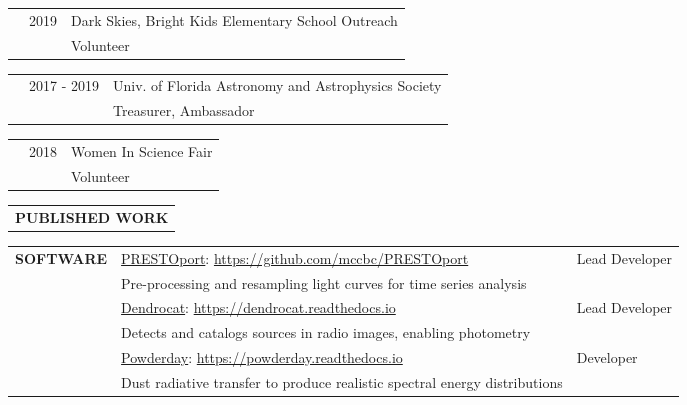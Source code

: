 \documentclass{article}
\begin{document}
\vspace{0.25cm}
\begin{tabular}{p{4cm}p{2.2cm}l}
    &2019 & Dark Skies, Bright Kids Elementary School Outreach \\
    &             & \small Volunteer
\end{tabular}

\vspace{0.25cm}
\begin{tabular}{p{4cm}p{2.2cm}l}
    &2017 - 2019 & Univ. of Florida Astronomy and Astrophysics Society \\
    &             & \small Treasurer, Ambassador
\end{tabular}

\vspace{0.25cm}
\begin{tabular}{p{4cm}p{2.2cm}l}
    &2018 & Women In Science Fair \\
    &             & \small Volunteer
\end{tabular}
\vspace{0.5cm}

\renewcommand\refname{\vskip -1cm}
\nocite{*}


\newpage
\begin{tabular}{p{4cm}}
   \large{\textbf{PUBLISHED WORK}} \vspace{-0.45cm}\\
\end{tabular}

\hspace{4.6cm}\begin{minipage}{\dimexpr\textwidth-5.2cm}

\xdef\tpd{\the\prevdepth}
\end{minipage}
\vspace{0.5cm}


\thispagestyle{empty}


\begin{tabular}{p{4cm}ll}
    \large{\textbf{SOFTWARE}} &\href{https://github.com/mccbc/PRESTOport}{PRESTOport}: \href{https://github.com/mccbc/PRESTOport}{https://github.com/mccbc/PRESTOport} &  Lead Developer\\
    &\small Pre-processing and resampling light curves for time series analysis & \vspace{0.25cm} \\
    &\href{https://github.com/cmcclellan1010/dendrocat
}{Dendrocat}: \href{https://dendrocat.readthedocs.io}{https://dendrocat.readthedocs.io} & Lead Developer \\
    &\small Detects and catalogs sources in radio images, enabling photometry & \vspace{0.25cm} \\
    &\href{https://powderday.readthedocs.io/en/latest/index.html}{Powderday}: \href{https://powderday.readthedocs.io/en/latest/index.html}{https://powderday.readthedocs.io} & Developer \\ 
    &\small Dust radiative transfer to produce realistic spectral energy distributions & \\
\end{tabular}
\vspace{0.5cm}
\end{document}

